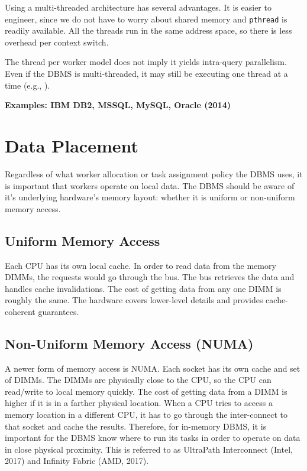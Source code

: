 \documentclass[11pt]{article}
\begin{document}
Using a multi-threaded architecture has several advantages. It is easier to engineer, since we do not have to worry about shared memory and \texttt{pthread} is readily available. All the threads run in the same address space, so there is less overhead per context switch.

The thread per worker model does not imply it yields intra-query parallelism. Even if the DBMS is multi-threaded, it may still be executing one thread at a time (e.g., ).

\textbf{Examples: IBM DB2, MSSQL, MySQL, Oracle (2014)}


\section{Data Placement}
Regardless of what worker allocation or task assignment policy the DBMS uses, it is important that workers operate on local data. The DBMS should be aware of it's underlying hardware's memory layout: whether it is uniform or non-uniform memory access.

\subsection*{Uniform Memory Access}
Each CPU has its own local cache. In order to read data from the memory DIMMs, the requests would go through the bus. The bus retrieves the data and handles cache invalidations. The cost of getting data from any one DIMM is roughly the same. The hardware covers lower-level details and provides cache-coherent guarantees.

\subsection*{Non-Uniform Memory Access (NUMA)}
A newer form of memory access is NUMA. Each socket has its own cache and set of DIMMs. The DIMMs are physically close to the CPU, so the CPU can read/write to local memory quickly. The cost of getting data from a DIMM is higher if it is in a farther physical location. When a CPU tries to access a memory location in a different CPU, it has to go through the inter-connect to that socket and cache the results. Therefore, for in-memory DBMS, it is important for the DBMS know where to run its tasks in order to operate on data in close physical proximity. This is referred to as UltraPath Interconnect (Intel, 2017) and Infinity Fabric (AMD, 2017).
\end{document}
